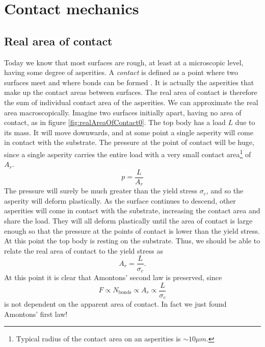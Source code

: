\documentclass[twoside,english]{uiofysmaster}
\begin{document}
\section{Contact mechanics} \label{sec:contactMechanics}

\subsection{Real area of contact}
Today we know that most surfaces are rough, at least at a microscopic level, having some degree of asperities. 
A \textit{contact} is defined as a point where two surfaces meet and where bonds can be formed \cite{Introduction2Friction}.  
It is actually the asperities that make up the contact areas between surfaces.
The real area of contact is therefore the sum of individual contact area of the asperities. 
We can approximate the real area macroscopically. 
Imagine two surfaces initially apart, having no area of contact, as in figure \ref{fig:realAreaOfContact0}. 
The top body has a load $L$ due to its mass. 
It will move downwards, and at some point a single asperity will come in contact with the substrate.
The pressure at the point of contact will be huge, since a single asperity carries the entire load with a very small contact area\footnote{Typical radius of the contact area on an asperities is $\sim10 \mu m$.} of $A_r$.
\begin{equation}
p = \frac{L}{A_r}
\end{equation}
The pressure will surely be much greater than the yield stress $\sigma_c$, and so the asperity will deform plastically. 
As the surface continues to descend, other asperities will come in contact with the substrate, increasing the contact area and share the load. 
They will all deform plastically until the area of contact is large enough so that the pressure at the points of contact is lower than the yield stress.
At this point the top body is resting on the substrate.
Thus, we should be able to relate the real area of contact to the yield stress as
\begin{equation}
A_r =  \frac{L}{\sigma_c}.
\end{equation}
At this point it is clear that Amontons' second law is preserved, since 
\begin{equation}
F\propto N_\text{bonds}\propto A_r \propto \frac{L}{\sigma_c}
\end{equation}
is not dependent on the apparent area of contact. 
In fact we just found Amontons' first law!
\end{document}
